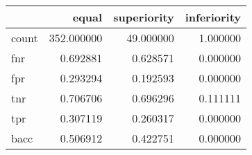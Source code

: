 \begin{tabular}{lrrr}
\toprule
{} &       equal &  superiority &  inferiority \\
\midrule
count &  352.000000 &    49.000000 &     1.000000 \\
fnr   &    0.692881 &     0.628571 &     0.000000 \\
fpr   &    0.293294 &     0.192593 &     0.000000 \\
tnr   &    0.706706 &     0.696296 &     0.111111 \\
tpr   &    0.307119 &     0.260317 &     0.000000 \\
bacc  &    0.506912 &     0.422751 &     0.000000 \\
\bottomrule
\end{tabular}
